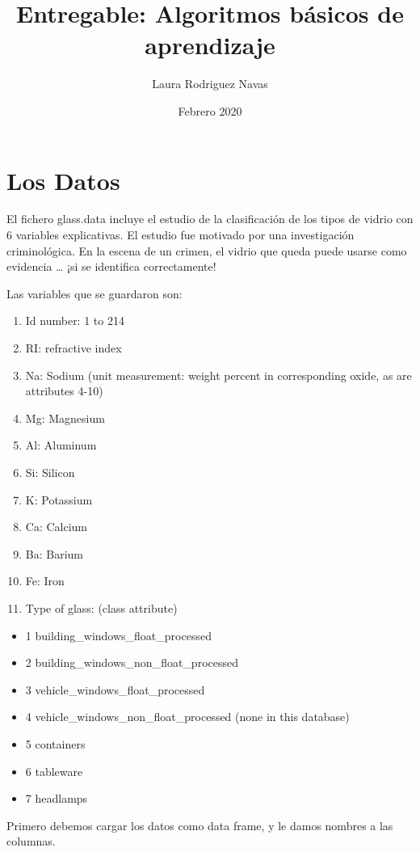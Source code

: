 \documentclass[]{article}
\title{Entregable: Algoritmos básicos de aprendizaje}
\author{Laura Rodriguez Navas}
\date{Febrero 2020}
\providecommand{\tightlist}{%
  \setlength{\itemsep}{0pt}\setlength{\parskip}{0pt}}
\begin{document}
\maketitle

\hypertarget{los-datos}{%
\section{Los Datos}\label{los-datos}}

El fichero glass.data incluye el estudio de la clasificación de los tipos de vidrio con 6 variables explicativas. El estudio fue motivado por una investigación criminológica. En la escena de un crimen, el vidrio que queda puede usarse como evidencia \ldots{} ¡si se identifica correctamente!

Las variables que se guardaron son:

\begin{enumerate}
\def\labelenumi{\arabic{enumi}.}
\tightlist
\item
  Id number: 1 to 214
\item
  RI: refractive index
\item
  Na: Sodium (unit measurement: weight percent in corresponding oxide,
  as are attributes 4-10)
\item
  Mg: Magnesium
\item
  Al: Aluminum
\item
  Si: Silicon
\item
  K: Potassium
\item
  Ca: Calcium
\item
  Ba: Barium
\item
  Fe: Iron
\item
  Type of glass: (class attribute)
\end{enumerate}

\begin{itemize}
\tightlist
\item
  1 building\_windows\_float\_processed
\item
  2 building\_windows\_non\_float\_processed
\item
  3 vehicle\_windows\_float\_processed
\item
  4 vehicle\_windows\_non\_float\_processed (none in this database)
\item
  5 containers
\item
  6 tableware
\item
  7 headlamps
\end{itemize}

Primero debemos cargar los datos como data frame, y le damos nombres a las columnas.
\end{document}
